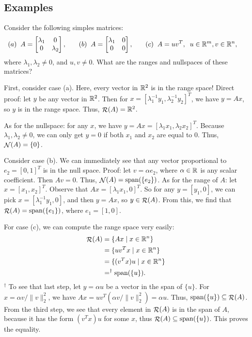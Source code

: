 \documentclass[12pt]{article}
\begin{document}
\subsection{Examples}

\begin{example}
Consider the following simples matrices:
%
\begin{align*}
(a) \;\; & A = \left[ \begin{matrix}
\lambda_1 & 0 \\
0 & \lambda_2
\end{matrix} \right], &&& (b) \;\; & A = \left[ \begin{matrix}
\lambda_1 & 0 \\
0 & 0
\end{matrix} \right], &&& (c) \;\; & A = uv^T, \;\; u \in { {\mathbb R}^{m} }, v \in { {\mathbb R}^{n} },
\end{align*}
%
where $\lambda_1, \lambda_2 \neq 0$, and $u,v \neq 0$. What are the ranges and nullspaces of these matrices?

First, consider case (a). Here, every vector in ${ {\mathbb R}^{2} }$ is in the range space! Direct proof: let $y$ be any vector in ${ {\mathbb R}^{2} }$. Then for $x = [ \lambda_1^{-1} y_1, \lambda_2^{-1} y_2]^T$, we have $y = Ax$, so $y$ is in the range space. Thus, $\mathop{\mathcal{R}}\nolimits(A) = { {\mathbb R}^{2} }$. 

As for the nullspace: for any $x$, we have $y = Ax = [\lambda_1 x_1, \lambda_2 x_2]^T$. Because $\lambda_1, \lambda_2 \neq 0$, we can only get $y=0$ if both $x_1$ and $x_2$ are equal to $0$. Thus, $\mathop{\mathcal{N}}\nolimits(A) = \{0\}$. 

Consider case (b). We can immediately see that any vector proportional to $e_2 = [0, 1]^T$ is in the null space. Proof: let $v = \alpha e_2$, where $\alpha \in { {\mathbb R}^{} }$ is any scalar coefficient. Then $Av = 0$. Thus, $\mathop{\mathcal{N}}\nolimits(A) = \text{span}(\{e_2\})$. As for the range of $A$: let $x = [x_1, x_2]^T$. Observe that $Ax = [\lambda_1 x_1, 0]^T$. So for any $y = [y_1, 0]$, we can pick $x = [\lambda_1^{-1} y_1, 0]$, and then $y = Ax$, so $y \in \mathop{\mathcal{R}}\nolimits(A)$. From this, we find that $\mathop{\mathcal{R}}\nolimits(A) = \text{span}(\{e_1\})$, where $e_1 = [1, 0]$. 

For case (c), we can compute the range space very easily: 
%
\begin{align*}
\mathop{\mathcal{R}}\nolimits(A) &= \{ Ax \; | \; x \in { {\mathbb R}^{n} }\} \\
&= \{ uv^T x \; | \; x \in { {\mathbb R}^{n} }\} \\
&= \{ (v^T x) u \; | \; x \in { {\mathbb R}^{n} }\} \\
&=^{\dagger} \text{span}(\{u\}).
\end{align*}
%
$^\dagger$ To see that last step, let $y = \alpha u$ be a vector in the span of $\{u\}$. For $x = \alpha v / \|v\|_2^2$, we have $Ax = uv^T (\alpha v / \|v\|_2^2) = \alpha u$. Thus, $\text{span}(\{u\}) \subseteq \mathop{\mathcal{R}}\nolimits(A)$. From the third step, we see that every element in $\mathop{\mathcal{R}}\nolimits(A)$ is in the span of $A$, because it has the form $(v^T x) u$ for some $x$, thus $\mathop{\mathcal{R}}\nolimits(A) \subseteq \text{span}(\{u\})$. This proves the equality.


\end{example}
\end{document}
